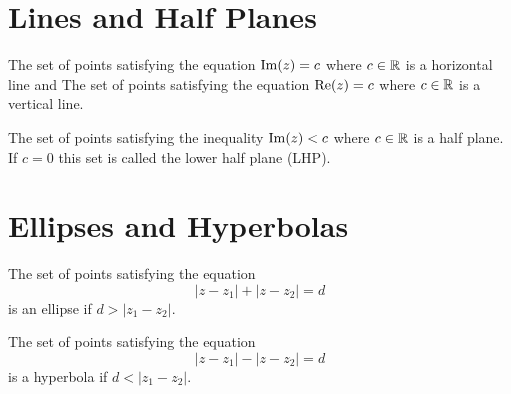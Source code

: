 \documentclass[handout]{ximera}
\begin{document}
\section{Lines and Half Planes}

\begin{example}[example 4]
The set of points satisfying the equation $\operatorname{Im}(z) = c$ where $c \in \mathbb R$ is a horizontal line and
The set of points satisfying the equation $\operatorname{Re}(z) = c$ where $c \in \mathbb R$ is a vertical line.

\end{example}


\begin{example}[example 5]
The set of points satisfying the inequality $\operatorname{Im}(z) < c$ where $c \in \mathbb R$ is a
half plane. If $c=0$ this set is called the lower half plane (LHP).
\end{example}

\begin{image}
\end{image}
\section{Ellipses and Hyperbolas}

\begin{example}[example 6]
The set of points satisfying the equation
\[
|z-z_1| + |z-z_2| = d
\]
is an ellipse if $d > |z_1 -z_2|$.
\end{example}


\begin{example}[example 7]
The set of points satisfying the equation
\[
|z-z_1| - |z-z_2| = d
\]
is a hyperbola if $d < |z_1 -z_2|$.
\end{example}
\end{document}
